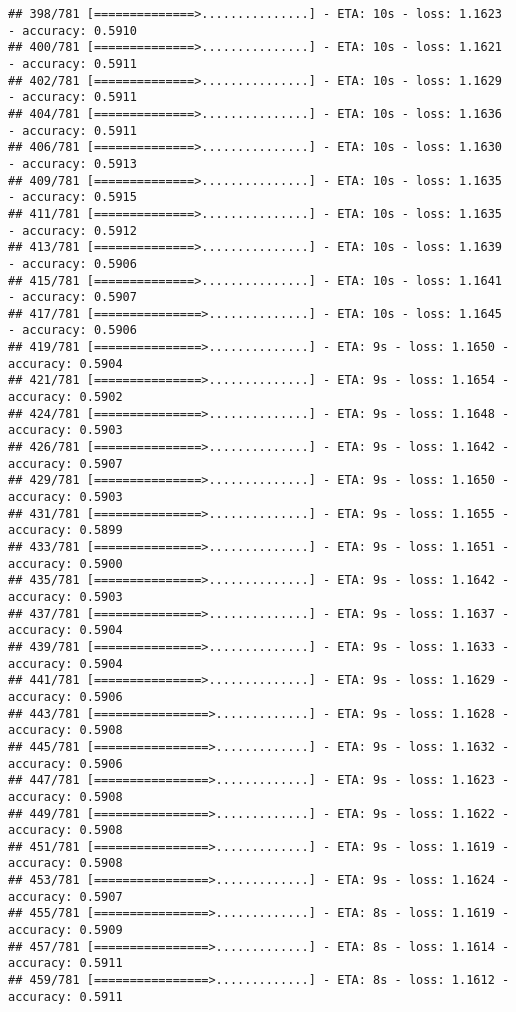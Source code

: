 \documentclass[
]{article}
\begin{document}
\begin{verbatim}
## 398/781 [==============>...............] - ETA: 10s - loss: 1.1623 - accuracy: 0.5910
## 400/781 [==============>...............] - ETA: 10s - loss: 1.1621 - accuracy: 0.5911
## 402/781 [==============>...............] - ETA: 10s - loss: 1.1629 - accuracy: 0.5911
## 404/781 [==============>...............] - ETA: 10s - loss: 1.1636 - accuracy: 0.5911
## 406/781 [==============>...............] - ETA: 10s - loss: 1.1630 - accuracy: 0.5913
## 409/781 [==============>...............] - ETA: 10s - loss: 1.1635 - accuracy: 0.5915
## 411/781 [==============>...............] - ETA: 10s - loss: 1.1635 - accuracy: 0.5912
## 413/781 [==============>...............] - ETA: 10s - loss: 1.1639 - accuracy: 0.5906
## 415/781 [==============>...............] - ETA: 10s - loss: 1.1641 - accuracy: 0.5907
## 417/781 [===============>..............] - ETA: 10s - loss: 1.1645 - accuracy: 0.5906
## 419/781 [===============>..............] - ETA: 9s - loss: 1.1650 - accuracy: 0.5904 
## 421/781 [===============>..............] - ETA: 9s - loss: 1.1654 - accuracy: 0.5902
## 424/781 [===============>..............] - ETA: 9s - loss: 1.1648 - accuracy: 0.5903
## 426/781 [===============>..............] - ETA: 9s - loss: 1.1642 - accuracy: 0.5907
## 429/781 [===============>..............] - ETA: 9s - loss: 1.1650 - accuracy: 0.5903
## 431/781 [===============>..............] - ETA: 9s - loss: 1.1655 - accuracy: 0.5899
## 433/781 [===============>..............] - ETA: 9s - loss: 1.1651 - accuracy: 0.5900
## 435/781 [===============>..............] - ETA: 9s - loss: 1.1642 - accuracy: 0.5903
## 437/781 [===============>..............] - ETA: 9s - loss: 1.1637 - accuracy: 0.5904
## 439/781 [===============>..............] - ETA: 9s - loss: 1.1633 - accuracy: 0.5904
## 441/781 [===============>..............] - ETA: 9s - loss: 1.1629 - accuracy: 0.5906
## 443/781 [================>.............] - ETA: 9s - loss: 1.1628 - accuracy: 0.5908
## 445/781 [================>.............] - ETA: 9s - loss: 1.1632 - accuracy: 0.5906
## 447/781 [================>.............] - ETA: 9s - loss: 1.1623 - accuracy: 0.5908
## 449/781 [================>.............] - ETA: 9s - loss: 1.1622 - accuracy: 0.5908
## 451/781 [================>.............] - ETA: 9s - loss: 1.1619 - accuracy: 0.5908
## 453/781 [================>.............] - ETA: 9s - loss: 1.1624 - accuracy: 0.5907
## 455/781 [================>.............] - ETA: 8s - loss: 1.1619 - accuracy: 0.5909
## 457/781 [================>.............] - ETA: 8s - loss: 1.1614 - accuracy: 0.5911
## 459/781 [================>.............] - ETA: 8s - loss: 1.1612 - accuracy: 0.5911

\end{verbatim}
\end{document}
